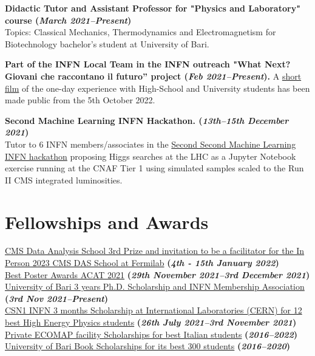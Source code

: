 \documentclass[11pt]{res}
\newcommand{\MarginText}[1]{\section{#1}\vspace{10pt}}
\begin{document}
\begin{resume}
\textbf{Didactic Tutor and Assistant Professor for "Physics and Laboratory" course (\textit{March 2021--Present})}\\
Topics: Classical Mechanics, Thermodynamics and Electromagnetism for Biotechnology bachelor's student at University of Bari.

\textbf{Part of the INFN Local Team in the INFN outreach "What Next? Giovani che raccontano il futuro” project (\textit{Feb 2021--Present}).}
A \href{https://next.infn.it/il-cortometraggio/}{short film} of the one-day experience with High-School and University students has been made public from the 5th October 2022.

\textbf{Second Machine Learning INFN Hackathon. (\textit{13th--15th December 2021})}\\ 
Tutor to 6 INFN members/associates in the \href{https://agenda.infn.it/event/28565/contributions/148551/}{Second Second Machine Learning INFN hackathon} proposing Higgs searches at the LHC as a Jupyter Notebook exercise running at the CNAF Tier 1 using simulated samples scaled to the Run II CMS integrated luminosities.


\MarginText{Fellowships and Awards}
\href{https://indico.cern.ch/event/1088671/}{CMS Data Analysis School 3rd Prize and invitation to be a facilitator for the In Person 2023 CMS DAS School at Fermilab} \textbf{(\textit{4th - 15th January 2022})}\\
\href{https://indico.cern.ch/event/855454/contributions/4596351/}{Best Poster Awards ACAT 2021} \textbf{(\textit{29th November 2021--3rd December 2021})}\\
\href{https://dottorato.fisica.uniba.it}{University of Bari 3 years Ph.D. Scholarship and INFN Membership Association} \textbf{(\textit{3rd Nov 2021--Present})}\\
\href{https://web.infn.it/csn1/index.php/en/}{CSN1 INFN 3 months Scholarship at International Laboratories (CERN) for 12 best High Energy Physics students} \textbf{(\textit{26th July 2021--3rd November 2021})}\\
\href{https://www.ecomap.it/news.asp?idNews=67}{Private ECOMAP facility Scholarships for best Italian students} \textbf{(\textit{2016--2022})}\\
\href{https://www.uniba.it/studenti/segreterie-studenti/amministrative/buoni-libro-per-studenti-meritevoli}{University of Bari Book Scholarships for its best 300 students} \textbf{(\textit{2016--2020})}\\


\end{resume}
\end{document}
